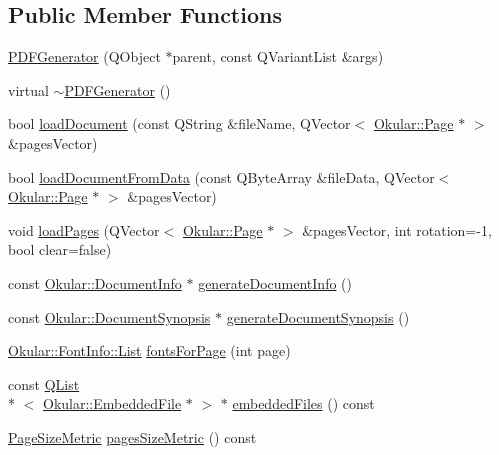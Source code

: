 \subsection*{Public Member Functions}
\begin{DoxyCompactItemize}
\item 
\hyperlink{classPDFGenerator_af71fed8f7f115cf780ed3e2baa1cc779}{P\+D\+F\+Generator} (Q\+Object $\ast$parent, const Q\+Variant\+List \&args)
\item 
virtual \hyperlink{classPDFGenerator_aae6389fe4a4a22d937f645f2e6cb4c4c}{$\sim$\+P\+D\+F\+Generator} ()
\item 
bool \hyperlink{classPDFGenerator_ab932e252efb8612a72324bda2c84e13c}{load\+Document} (const Q\+String \&file\+Name, Q\+Vector$<$ \hyperlink{classOkular_1_1Page}{Okular\+::\+Page} $\ast$ $>$ \&pages\+Vector)
\item 
bool \hyperlink{classPDFGenerator_a86fd391705e822ad399f8d418237a622}{load\+Document\+From\+Data} (const Q\+Byte\+Array \&file\+Data, Q\+Vector$<$ \hyperlink{classOkular_1_1Page}{Okular\+::\+Page} $\ast$ $>$ \&pages\+Vector)
\item 
void \hyperlink{classPDFGenerator_a73ba84528e0f5eefc41aa958e2b2fcd3}{load\+Pages} (Q\+Vector$<$ \hyperlink{classOkular_1_1Page}{Okular\+::\+Page} $\ast$ $>$ \&pages\+Vector, int rotation=-\/1, bool clear=false)
\item 
const \hyperlink{classOkular_1_1DocumentInfo}{Okular\+::\+Document\+Info} $\ast$ \hyperlink{classPDFGenerator_a205c5054933ee0df179f27bb6cf3a70e}{generate\+Document\+Info} ()
\item 
const \hyperlink{classOkular_1_1DocumentSynopsis}{Okular\+::\+Document\+Synopsis} $\ast$ \hyperlink{classPDFGenerator_a9190f8cb03a628fd4bd097fc13c35545}{generate\+Document\+Synopsis} ()
\item 
\hyperlink{classOkular_1_1FontInfo_ada799641ba87703c808645f57fdfafaa}{Okular\+::\+Font\+Info\+::\+List} \hyperlink{classPDFGenerator_a0a10ed0a1e9120fcfef66d53be734a7d}{fonts\+For\+Page} (int page)
\item 
const \hyperlink{classQList}{Q\+List}\\*
$<$ \hyperlink{classOkular_1_1EmbeddedFile}{Okular\+::\+Embedded\+File} $\ast$ $>$ $\ast$ \hyperlink{classPDFGenerator_acd876f79b66423f05ae149e12f922aff}{embedded\+Files} () const 
\item 
\hyperlink{classOkular_1_1Generator_aa09b8aeb5398ea5f07644f35bd5934f3}{Page\+Size\+Metric} \hyperlink{classPDFGenerator_ac59b305492d467a8057a72699f77a606}{pages\+Size\+Metric} () const 

\end{DoxyCompactItemize}
